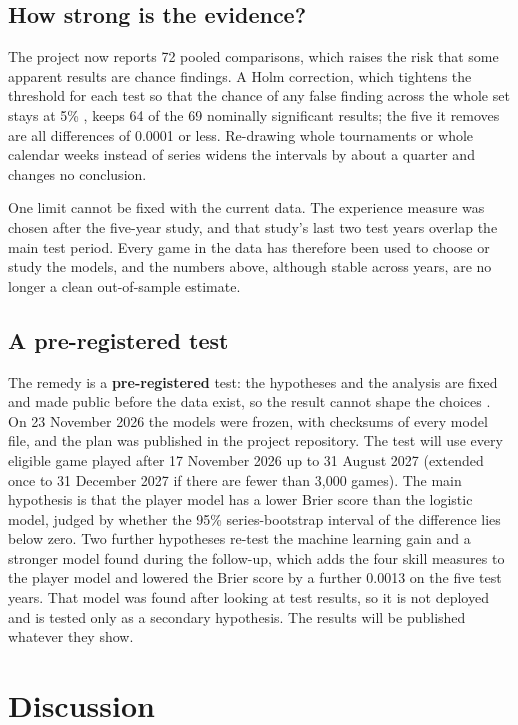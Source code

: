\documentclass[12pt,a4paper]{article}
\begin{document}
\subsection{How strong is the evidence?}

The project now reports 72 pooled comparisons, which raises the risk that some apparent results are chance findings. A Holm correction, which tightens the threshold for each test so that the chance of any false finding across the whole set stays at 5\% \citep{holm1979}, keeps 64 of the 69 nominally significant results; the five it removes are all differences of 0.0001 or less. Re-drawing whole tournaments or whole calendar weeks instead of series widens the intervals by about a quarter and changes no conclusion.

One limit cannot be fixed with the current data. The experience measure was chosen after the five-year study, and that study's last two test years overlap the main test period. Every game in the data has therefore been used to choose or study the models, and the numbers above, although stable across years, are no longer a clean out-of-sample estimate.

\subsection{A pre-registered test}

The remedy is a \textbf{pre-registered} test: the hypotheses and the analysis are fixed and made public before the data exist, so the result cannot shape the choices \citep{nosek2018}. On 23 November 2026 the models were frozen, with checksums of every model file, and the plan was published in the project repository. The test will use every eligible game played after 17 November 2026 up to 31 August 2027 (extended once to 31 December 2027 if there are fewer than 3,000 games). The main hypothesis is that the player model has a lower Brier score than the logistic model, judged by whether the 95\% series-bootstrap interval of the difference lies below zero. Two further hypotheses re-test the machine learning gain and a stronger model found during the follow-up, which adds the four skill measures to the player model and lowered the Brier score by a further 0.0013 on the five test years. That model was found after looking at test results, so it is not deployed and is tested only as a secondary hypothesis. The results will be published whatever they show.

\section{Discussion}\label{sec:discussion}
\end{document}
